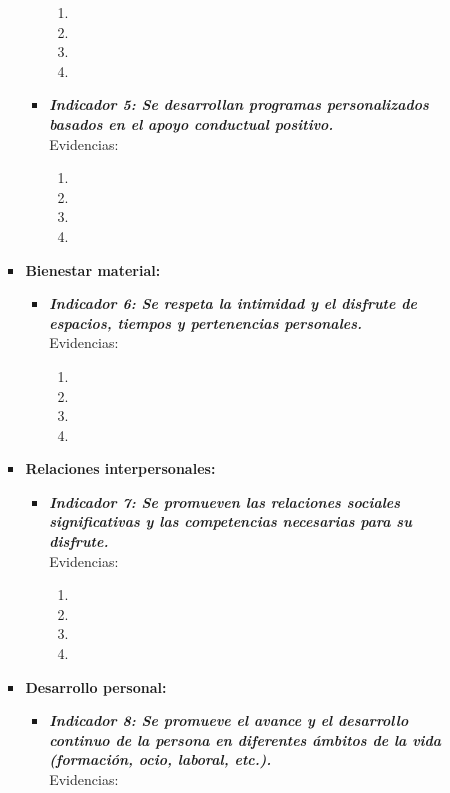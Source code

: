 \begin{itemize}
\begin{itemize}
\begin{itemize}
\begin{itemize}
				\begin{enumerate}
					\item 
					\item 
					\item 
					\item 
				\end{enumerate}
				\item \textbf{\textit{Indicador 5: Se desarrollan programas personalizados basados en el apoyo conductual positivo.}}\\Evidencias:
				\begin{enumerate}
					\item 
					\item 
					\item 
					\item 
				\end{enumerate}
			\end{itemize}
			\item \textbf{Bienestar material:}
			\begin{itemize}
				\item \textbf{\textit{Indicador 6: Se respeta la intimidad y el disfrute de espacios, tiempos y pertenencias personales.}}\\Evidencias:
				\begin{enumerate}
					\item 
					\item 
					\item 
					\item 
				\end{enumerate}
			\end{itemize}
			\item \textbf{Relaciones interpersonales:}
			\begin{itemize}
				\item \textbf{\textit{Indicador 7: Se promueven las relaciones sociales significativas y las competencias necesarias para su disfrute.}}\\Evidencias:
				
				\begin{enumerate}
					\item 
					\item 
					\item 
					\item 
				\end{enumerate}
			\end{itemize}
			\item \textbf{Desarrollo personal:}
			\begin{itemize}
				\item \textbf{\textit{Indicador 8: Se promueve el avance y el desarrollo continuo de la persona en diferentes ámbitos de la vida (formación, ocio, laboral, etc.).}}\\Evidencias:
				

\end{itemize}
\end{itemize}
\end{itemize}
\end{itemize}
